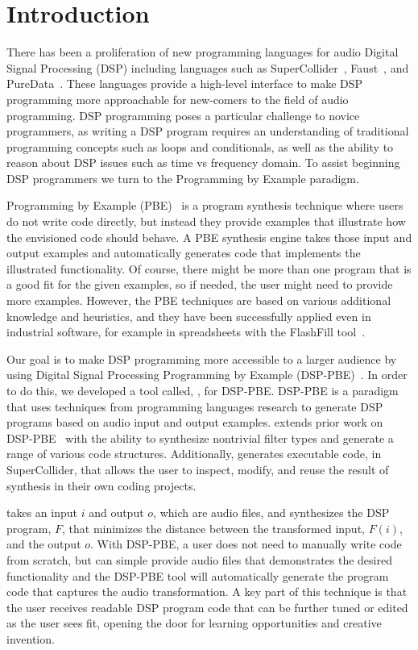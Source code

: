 
\section{Introduction}

There has been a proliferation of new programming languages for audio Digital Signal Processing (DSP) including languages such as SuperCollider~\cite{supercollider}, Faust~\cite{orlarey2009faust}, and PureData~\cite{puredata}.
These languages provide a high-level interface to make DSP programming more approachable for new-comers to the field of audio programming.
DSP programming poses a particular challenge to novice programmers, as writing a DSP program requires an understanding of traditional programming concepts such as loops and conditionals, as well as the ability to reason about DSP issues such as time vs frequency domain.
To assist beginning DSP programmers we turn to the Programming by Example paradigm.

Programming by Example (PBE)~\cite{cypher93,lieberman01} is a program synthesis technique 
where users do not write code directly, but instead they provide examples that illustrate how the envisioned 
code should behave. A PBE synthesis engine takes those input and output examples and 
automatically generates code that implements the illustrated functionality. Of course, there might be more than
one program that is a good fit for the given examples, so if needed, the user might need to provide more examples.
However, the PBE techniques are based on various additional knowledge and heuristics, and they have been 
successfully applied even in industrial software, for example  in spreadsheets with the FlashFill tool~\cite{flashfill}.

Our goal is to make DSP programming more accessible to a larger audience by using Digital Signal Processing Programming by Example (DSP-PBE)~\cite{SantolucitoFARM}.
In order to do this, we developed a tool called, \ourTool, for DSP-PBE.
DSP-PBE is a paradigm that uses techniques from programming languages research to generate DSP programs based on audio input and output examples.
\ourTool extends prior work on DSP-PBE~\cite{SantolucitoFARM} with the ability to synthesize nontrivial filter types and generate a range of various code structures.
Additionally, \ourTool generates executable code, in SuperCollider, that allows the user to inspect, modify, and reuse the result of synthesis in their own coding projects.

\ourTool takes an input $i$ and output $o$, which are audio files, and synthesizes the DSP program, $F$, that minimizes the distance between the transformed input, $F(i)$, and the output $o$.
With DSP-PBE, a user does not need to manually write code from scratch, but can simple provide audio files that demonstrates the desired functionality and the DSP-PBE tool will automatically generate the program code that captures the audio transformation.
A key part of this technique is that the user receives readable DSP program code that can be further tuned or edited as the user sees fit, opening the door for learning opportunities and creative invention.


